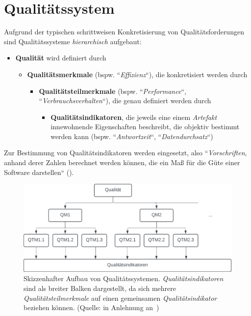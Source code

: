 \section{Qualitätssystem}

\begin{tcolorbox}[title=Qualitätssystem]
    Aufgrund der typischen schrittweisen Konkretisierung von Qualitätsforderungen sind Qualitätssysteme  \textit{hierarchisch} aufgebaut:

    \begin{itemize}
        \item \textbf{Qualität} wird definiert durch
        \begin{itemize}
            \item  \textbf{Qualitätsmerkmale} (bspw. ``\textit{Effizienz}``), die konkretisiert werden durch
            \begin{itemize}
                \item  \textbf{Qualitätsteilmerkmale} (bspw. ``\textit{Performance}``, ``\textit{Verbrauchsverhalten}``), die genau definiert werden durch
                \begin{itemize}
                    \item \textbf{Qualitätsindikatoren}, die jeweils eine einem \textit{Artefakt} innewohnende Eigenschaften beschreibt, die objektiv bestimmt werden kann (bspw. ``\textit{Antwortzeit}``, ``\textit{Datendurchsatz}``)
                \end{itemize}
            \end{itemize}
        \end{itemize}
    \end{itemize}

    \noindent
    Zur Bestimmung von Qualitätsindikatoren werden  eingesetzt, also ``\textit{Vorschriften}, anhand derer Zahlen berechnet werden können, die ein Maß für die Güte einer Software darstellen`` (\cite[3, Hervorhebung eigene]{Wed09c}).
\end{tcolorbox}


\begin{figure}
    \centering
    \includegraphics[scale=0.8]{part four/Qualität/img/qualitätssysteme}
    \caption{Skizzenhafter Aufbau von Qualitätssystemen. \textit{Qualitätsindikatoren} sind als breiter Balken dargestellt, da sich mehrere \textit{Qualitätsteilmerkmale} auf einen gemeinsamen \textit{Qualitätsindikator} beziehen können. (Quelle: in Anlehnung an~\cite[Abb. 1.1, 3]{Wed09c})}
    \label{fig:qualitätssysteme-cc}
\end{figure}